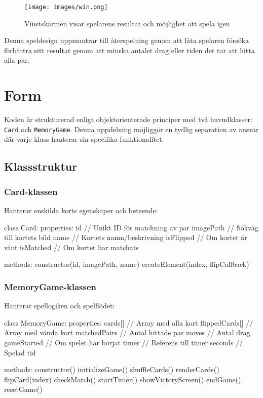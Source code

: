 \documentclass[a4paper,12pt]{article}
\begin{document}
\begin{figure}[h]
    \centering
    \texttt{[image: images/win.png]}
    \caption{Vinstskärmen visar spelarens resultat och möjlighet att spela igen}
    \label{fig:game_win}
\end{figure}

Denna speldesign uppmuntrar till återspelning genom att låta spelaren försöka förbättra sitt resultat genom att minska antalet drag eller tiden det tar att hitta alla par.

\section*{Form}
Koden är strukturerad enligt objektorienterade principer med två huvudklasser: \texttt{Card} och \texttt{MemoryGame}. Denna uppdelning möjliggör en tydlig separation av ansvar där varje klass hanterar sin specifika funktionalitet.

\subsection*{Klassstruktur}
\subsubsection*{Card-klassen}
Hanterar enskilda korts egenskaper och beteende:

\begin{codebox}
class Card:
    properties:
        id          // Unikt ID för matchning av par
        imagePath   // Sökväg till kortets bild
        name        // Kortets namn/beskrivning
        isFlipped   // Om kortet är vänt
        isMatched   // Om kortet har matchats

    methods:
        constructor(id, imagePath, name)
        createElement(index, flipCallback)
\end{codebox}

\subsubsection*{MemoryGame-klassen}
Hanterar spellogiken och spelflödet:

\begin{codebox}
class MemoryGame:
    properties:
        cards[]           // Array med alla kort
        flippedCards[]    // Array med vända kort
        matchedPairs      // Antal hittade par
        moves            // Antal drag
        gameStarted      // Om spelet har börjat
        timer            // Referens till timer
        seconds          // Spelad tid

    methods:
        constructor()
        initializeGame()
        shuffleCards()
        renderCards()
        flipCard(index)
        checkMatch()
        startTimer()
        showVictoryScreen()
        endGame()
        resetGame()
\end{codebox}
\end{document}
